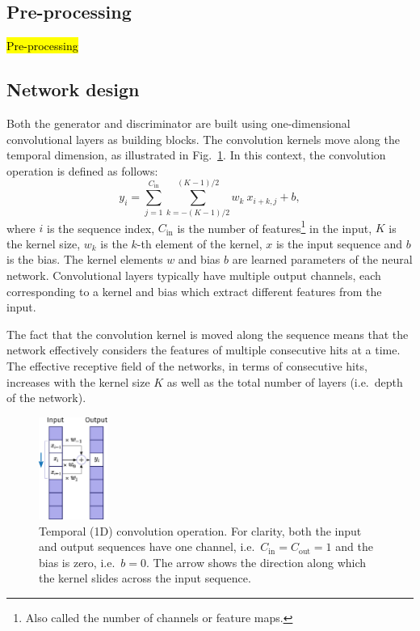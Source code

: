 \subsection{Pre-processing}
\hl{Pre-processing}

\subsection{Network design}
Both the generator and discriminator are built using one-dimensional convolutional layers as building blocks.
The convolution kernels move along the temporal dimension, as illustrated in Fig.~\ref{fig:temporal_conv}. 
In this context, the convolution operation is defined as follows:
\begin{equation}
    y_{i} = \sum_{j=1}^{C_\mathrm{in}} \sum_{k=-(K-1)/2}^{(K-1)/2} w_k\ x_{i+k,j} + b,
\end{equation}
where $i$ is the sequence index, $C_\mathrm{in}$ is the number of features\footnote{Also called the number of channels or feature maps.} in the input, $K$ is the kernel size, $w_k$ is the $k$-th element of the kernel, $x$ is the input sequence and $b$ is the bias. The kernel elements $w$ and bias $b$ are learned parameters of the neural network. 
Convolutional layers typically have multiple output channels, each corresponding to a kernel and bias which extract different features from the input.

The fact that the convolution kernel is moved along the sequence means that the network effectively considers the features of multiple consecutive hits at a time. The effective receptive field of the networks, in terms of consecutive hits, increases with the kernel size $K$ as well as the total number of layers (i.e.\ depth of the network).
\begin{figure}
    \centering
    \includegraphics[width=0.20\textwidth]{chapter4/1d_convolution.pdf}
    \caption{Temporal (1D) convolution operation. For clarity, both the input and output sequences have one channel, i.e.\  $C_\mathrm{in} = C_\mathrm{out} = 1$ and the bias is zero, i.e.\ $b = 0$. The arrow shows the direction along which the kernel slides across the input sequence.}
    \label{fig:temporal_conv}
\end{figure}


